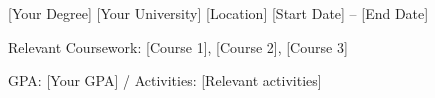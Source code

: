 \begin{cventries}
  \cventry
    {[Your Degree]} %
    {[Your University]} %
    {[Location]} %
    {[Start Date] -- [End Date]} %
    {
      \begin{cvitems}
        \item {Relevant Coursework: [Course 1], [Course 2], [Course 3]}
        \item {GPA: [Your GPA] / Activities: [Relevant activities]}
      \end{cvitems}
    }
\end{cventries}
